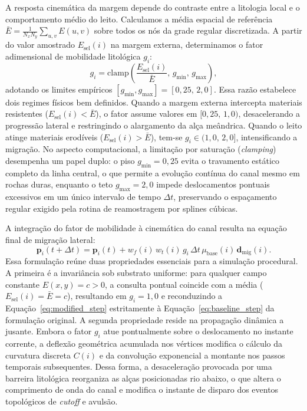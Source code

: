 \documentclass[9pt,a4paper,twocolumn]{extarticle}
\begin{document}
A resposta cinemática da margem depende do contraste entre a litologia local e o comportamento médio do leito. Calculamos a média espacial de referência $\bar{E} = \frac{1}{N_x N_y} \sum_{u,v} E(u,v)$ sobre todos os nós da grade regular discretizada. A partir do valor amostrado $E_{\text{sel}}(i)$ na margem externa, determinamos o fator adimensional de mobilidade litológica $g_i$:
\begin{equation}
    g_i = \text{clamp}\left( \frac{E_{\text{sel}}(i)}{\bar{E}}, \, g_{\min}, \, g_{\max} \right),
    \label{eq:mobility_factor}
\end{equation}
adotando os limites empíricos $[g_{\min}, g_{\max}] = [0{,}25,\, 2{,}0]$. Essa razão estabelece dois regimes físicos bem definidos. Quando a margem externa intercepta materiais resistentes ($E_{\text{sel}}(i) < \bar{E}$), o fator assume valores em $[0{,}25,\, 1{,}0)$, desacelerando a progressão lateral e restringindo o alargamento da alça meândrica. Quando o leito atinge materiais erodíveis ($E_{\text{sel}}(i) > \bar{E}$), tem-se $g_i \in (1{,}0,\, 2{,}0]$, intensificando a migração. No aspecto computacional, a limitação por saturação (\textit{clamping}) desempenha um papel duplo: o piso $g_{\min} = 0{,}25$ evita o travamento estático completo da linha central, o que permite a evolução contínua do canal mesmo em rochas duras, enquanto o teto $g_{\max} = 2{,}0$ impede deslocamentos pontuais excessivos em um único intervalo de tempo $\Delta t$, preservando o espaçamento regular exigido pela rotina de reamostragem por splines cúbicas.

A integração do fator de mobilidade à cinemática do canal resulta na equação final de migração lateral:
\begin{equation}
    \mathbf{p}_i(t + \Delta t) = \mathbf{p}_i(t) + w_f(i) \, w_t(i) \, g_i \, \Delta t \, \mu_{\text{base}}(i) \, \mathbf{d}_{\text{mig}}(i).
    \label{eq:modified_step}
\end{equation}
Essa formulação reúne duas propriedades essenciais para a simulação procedural. A primeira é a invariância sob substrato uniforme: para qualquer campo constante $E(x,y) = c > 0$, a consulta pontual coincide com a média ($E_{\text{sel}}(i) = \bar{E} = c$), resultando em $g_i = 1{,}0$ e reconduzindo a Equação~\eqref{eq:modified_step} estritamente à Equação~\eqref{eq:baseline_step} da formulação original. A segunda propriedade reside na propagação dinâmica a jusante. Embora o fator $g_i$ atue pontualmente sobre o deslocamento no instante corrente, a deflexão geométrica acumulada nos vértices modifica o cálculo da curvatura discreta $C(i)$ e da convolução exponencial a montante nos passos temporais subsequentes. Dessa forma, a desaceleração provocada por uma barreira litológica reorganiza as alças posicionadas rio abaixo, o que altera o comprimento de onda do canal e modifica o instante de disparo dos eventos topológicos de \textit{cutoff} e avulsão.
\end{document}
